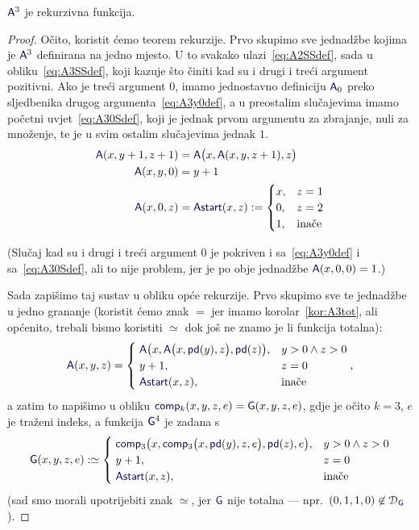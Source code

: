 \begin{propozicija}
    $\f A^3$ je rekurzivna funkcija.
\end{propozicija}
\begin{proof}
Očito, koristit ćemo teorem rekurzije. Prvo skupimo sve jednadžbe kojima je $\f A^3$ definirana na jedno mjesto. U to svakako ulazi~\eqref{eq:A2SSdef}, sada u obliku~\eqref{eq:A3SSdef}, koji kazuje što činiti kad su i drugi i treći argument pozitivni. Ako je treći argument $0$, imamo jednostavno definiciju $\f A_0$ preko sljedbenika drugog argumenta~\eqref{eq:A3y0def}, a u preostalim slučajevima imamo početni uvjet~\eqref{eq:A30Sdef}, koji je jednak prvom argumentu za zbrajanje, nuli za množenje, te je u svim ostalim slučajevima jednak $1$.
\begin{align}
\label{eq:A3SSdef}
    \f A(x,y+1,z+1)&=\f A\bigl(x,\f A(x,y,z+1),z\bigr)\\
\label{eq:A3y0def}
    \f A(x,y,0)&=y+1\\
\label{eq:A30Sdef}
    \f A(x,0,z)&=\f{Astart}(x,z):=\begin{cases}
        x,&z=1\\
        0,&z=2\\
        1,&\text{inače}
    \end{cases}
\end{align}

(Slučaj kad su i drugi i treći argument $0$ je pokriven i sa~\eqref{eq:A3y0def} i sa~\eqref{eq:A30Sdef}, ali to nije problem, jer je po obje jednadžbe $\f A(x,0,0)=1$.)

Sada zapišimo taj sustav u obliku opće rekurzije. Prvo skupimo sve te jednadžbe u jedno grananje (koristit ćemo znak $=$ jer imamo korolar~\ref{kor:A3tot}, ali općenito, trebali bismo koristiti $\simeq$ dok još ne znamo je li funkcija totalna):
\begin{equation}
    \f A(x,y,z)=\begin{cases}
        \;\f A\bigl(x,\f A\bigl(x,\f{pd}(y),z\bigr),\f{pd}(z)\bigr),&y>0\land z>0\\
        \;y+1,&z=0\\
        \;\f{Astart}(x,z),&\text{inače}
    \end{cases}\text,
\end{equation}
a zatim to napišimo u obliku $\f{comp}_k(x,y,z,e)=\f G(x,y,z,e)$, gdje je očito $k=3$, $e$ je traženi indeks, a funkcija $\f G^4$ je zadana s
\begin{equation}
    \f G(x,y,z,e):\simeq\begin{cases}
        \;\f{comp}_3\bigl(x,\f{comp}_3\bigl(x,\f{pd}(y),z,e\bigr),\f{pd}(z),e\bigr),&y>0\land z>0\\
        \;y+1,&z=0\\
        \;\f{Astart}(x,z),&\text{inače}
    \end{cases}
\end{equation}
(sad smo morali upotrijebiti znak $\simeq$, jer $\f G$ nije totalna --- npr.\ $(0,1,1,0)\not\in\dom{\f G}$).


\end{proof}

